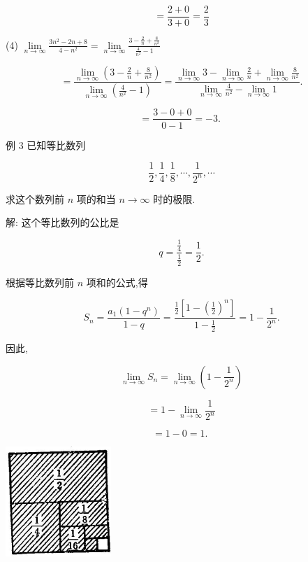 \documentclass[lang=cn,newtx,10pt,scheme=chinese]{elegantbook}
\begin{document}
\[
= \frac{2 + 0}{3 + 0} = \frac{2}{3}
\]

(4) \(\mathop{\lim }\limits_{{n \rightarrow \infty }}\frac{3{n}^{2} - {2n} + 8}{4 - {n}^{2}} = \mathop{\lim }\limits_{{n \rightarrow \infty }}\frac{3 - \frac{2}{n} + \frac{8}{{n}^{2}}}{\frac{4}{{n}^{2}} - 1}\)

\[
= \frac{\mathop{\lim }\limits_{{n \rightarrow \infty }}\left( {3 - \frac{2}{n} + \frac{8}{{n}^{2}}}\right) }{\mathop{\lim }\limits_{{n \rightarrow \infty }}\left( {\frac{4}{{n}^{2}} - 1}\right) } = \frac{\mathop{\lim }\limits_{{n \rightarrow \infty }}3 - \mathop{\lim }\limits_{{n \rightarrow \infty }}\frac{2}{n} + \mathop{\lim }\limits_{{n \rightarrow \infty }}\frac{8}{{n}^{2}}}{\mathop{\lim }\limits_{{n \rightarrow \infty }}\frac{4}{{n}^{2}} - \mathop{\lim }\limits_{{n \rightarrow \infty }}1}.
\]

\[
= \frac{3 - 0 + 0}{0 - 1} = - 3\text{. }
\]

例 3 已知等比数列

\[
\frac{1}{2},\frac{1}{4},\frac{1}{8},\cdots ,\frac{1}{{2}^{n}},\cdots
\]

求这个数列前 \(n\) 项的和当 \(n \rightarrow \infty\) 时的极限.

解: 这个等比数列的公比是

\[
q = \frac{\frac{1}{4}}{\frac{1}{2}} = \frac{1}{2}.
\]

根据等比数列前 \(n\) 项和的公式,得

\[
{S}_{n} = \frac{{a}_{1}\left( {1 - {q}^{n}}\right) }{1 - q} = \frac{\frac{1}{2}\left\lbrack {1 - {\left( \frac{1}{2}\right) }^{n}}\right\rbrack }{1 - \frac{1}{2}} = 1 - \frac{1}{{2}^{n}}.
\]

因此,

\[
\mathop{\lim }\limits_{{n \rightarrow \infty }}{S}_{n} = \mathop{\lim }\limits_{{n \rightarrow \infty }}\left( {1 - \frac{1}{{2}^{n}}}\right)
\]

\[
= 1 - \mathop{\lim }\limits_{{n \rightarrow \infty }}\frac{1}{{2}^{n}}
\]

\[
= 1 - 0 = 1\text{. }
\]

\begin{center}
	\includegraphics[max width=0.3\textwidth]{images/01912c18-5c3f-733d-b775-749ba9897a9d_14_791114.jpg}
\end{center}
\end{document}

